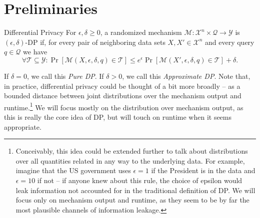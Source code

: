 \documentclass[11pt]{scrartcl} %
\begin{document}
\section{Preliminaries}
\begin{definition}
	\label{defn:differential_privacy}
	Differential Privacy \cite{DMNS06} \newline
	For $\epsilon, \delta \geq 0$, a randomized mechanism
	$\mathcal{M}: \mathcal{X}^n \times \mathcal{Q} \rightarrow \mathcal{Y}$ is
	$(\epsilon, \delta)$-DP if, for every pair of neighboring data sets $X, X' \in \mathcal{X}^n$ and
	every query $q \in \mathcal{Q}$ we have
	\[ \forall \mathcal{T} \subseteq \mathcal{Y}: \Pr[\mathcal{M}(X, \epsilon, \delta, q) \in \mathcal{T}] \leq e^{\epsilon} \Pr[\mathcal{M}(X', \epsilon, \delta, q) \in \mathcal{T}] + \delta. \]
\end{definition}
If $\delta = 0$, we call this \emph{Pure DP}. If $\delta > 0$, we call this \emph{Approximate DP}.
Note that, in practice, differential privacy could be thought of a bit more broadly -- as a bounded
distance between joint distributions over the mechanism output and runtime.\footnote{Conceivably, this idea
could be extended further to talk about distributions over all quantities related in any way to the underlying data.
For example, imagine that the US government uses $\epsilon = 1$ if the President is in the data and $\epsilon = 10$
if not -- if anyone knew about this rule, the choice of epsilon would leak information not accounted for in the
traditional definition of DP.
We will focus only on mechanism output and runtime, as they seem to be by far the most plausible
channels of information leakage.} We will focus mostly on the distribution over mechanism output, as this
is really the core idea of DP, but will touch on runtime when it seems appropriate.


\end{document}
